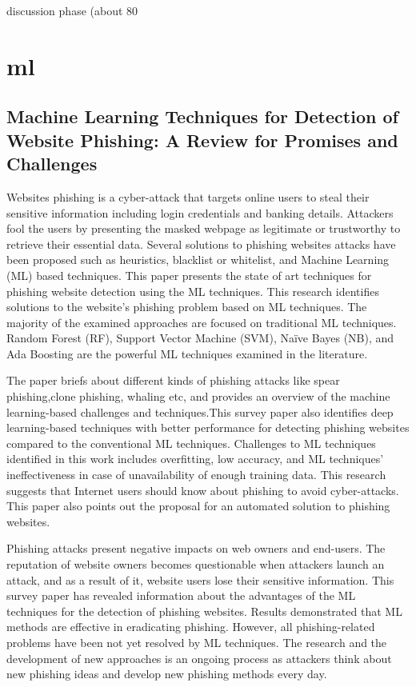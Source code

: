 discussion phase (about 80%


\section{ml}

\subsection{Machine Learning Techniques for Detection of Website Phishing: A Review for Promises and Challenges}

Websites phishing is a cyber-attack that targets online users to steal their sensitive information including login credentials and banking details. Attackers fool the users by presenting the masked webpage as legitimate or trustworthy to retrieve their essential data. Several solutions to phishing websites attacks have been proposed such as heuristics, blacklist or whitelist, and Machine Learning (ML) based techniques. This paper presents the state of art techniques for phishing website detection using the ML techniques. This research identifies solutions to the website's phishing problem based on ML techniques. The majority of the examined approaches are focused on traditional ML techniques. Random Forest (RF), Support Vector Machine (SVM), Naïve Bayes (NB), and Ada Boosting are the powerful ML techniques examined in the literature.

The paper briefs about different kinds of phishing attacks like spear phishing,clone phishing, whaling etc, and provides an overview of the machine learning-based challenges and techniques.This survey paper also identifies deep learning-based techniques with better performance for detecting phishing websites compared to the conventional ML techniques. Challenges to ML techniques identified in this work includes overfitting, low accuracy, and ML techniques' ineffectiveness in case of unavailability of enough training data. This research suggests that Internet users should know about phishing to avoid cyber-attacks. This paper also points out the proposal for an automated solution to phishing websites.

Phishing attacks present negative impacts on web owners and end-users. The reputation of website owners becomes questionable when attackers launch an attack, and as a result of it, website users lose their sensitive information. This survey paper has revealed information about the advantages of the ML techniques for the detection of phishing websites. Results demonstrated that ML methods are effective in eradicating phishing. However, all phishing-related problems have been not yet resolved by ML techniques. The research and the development of new approaches is an ongoing process as attackers think about new phishing ideas and develop new phishing methods every day.


